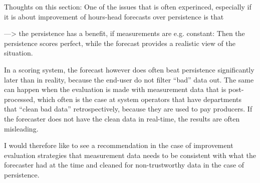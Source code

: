 \color{red}Thoughts on this section:
One of the issues that is often experinced, especially if it is about improvement of hours-head forecasts over persistence is that 

---> the persistence has a benefit, if measurements are e.g. constant: Then the persistence scores perfect, while the forecast provides a realistic view of the situation. 

In a scoring system, the forecast however does often beat persistence significantly later than in reality, because the end-user do not filter ``bad'' data out. The same can happen when the evaluation is made with measurement data that is post-processed, which often is the case at system operators that have departments that ``clean bad data'' retrospectively, because they are used to pay producers. If the forecaster does not have the clean data in real-time, the results are often misleading. 

I would therefore like to see a recommendation in the case of improvement evaluation strategies that measurement data needs to be consistent with what the forecaster had at the time and cleaned for non-trustworthy data in the case of persistence.
\color{black}



